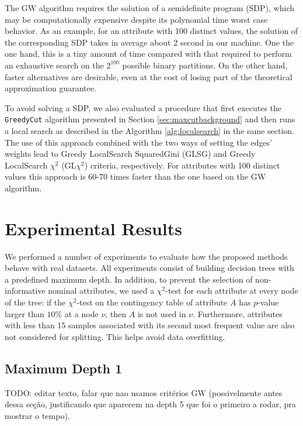 The GW algorithm  requires  the solution of a semidefinite program (SDP),
which may be computationally expensive despite  its 
polynomial time worst case  behavior.
As an example, for an attribute with 100 distinct values, the solution of
the corresponding SDP takes in average about 2 second in our machine.
One the one hand, this is a tiny amount of time 
compared with that required to perform an exhaustive search on the $2^{100}$
possible binary partitions. On the other hand, 
 faster alternatives are desirable, even
at the cost of losing part of the theoretical approximation guarantee. 

To avoid solving a SDP, 
we also evaluated a procedure
that first executes the {\tt GreedyCut} algorithm presented
in Section \ref{sec:maxcutbackground} and then runs a local search as described
in the Algorithm  \ref{alg:localsearch} in the same section. 
The use of this approach combined with the two
ways of setting the edges' weights lead to
 Greedy LocalSearch SquaredGini (GLSG) and 
Greedy LocalSearch $\chi^2$ (GL$\chi^2$) 
criteria, respectively.
For attributes with 100 distinct values this approach is 60-70
times faster than the one based on the GW algorithm.


\section{Experimental Results}

We performed a number of experiments to evaluate how the
proposed methods behave with real datasets.
All experiments consist of building decision trees
with a predefined maximum depth.  In addition,
to prevent the selection of non-informative nominal attributes, 
we used a $\chi^2$-test for each attribute at every node of
the tree: if the $\chi^2$-test  on the contingency table of attribute $A$
has $p$-value larger than $10\%$ at a node $\nu$, then
$A$ is not used in $\nu$. Furthermore, attributes with less than 15 samples associated with its
second most frequent value are also not considered for splitting. This helps  avoid data overfitting.


\subsection{Maximum Depth 1}

TODO: editar texto, falar que nao usamos critérios GW (possivelmente antes dessa seção, justificando que aparecem na depth 5 que foi o primeiro a rodar, pra mostrar o tempo).

